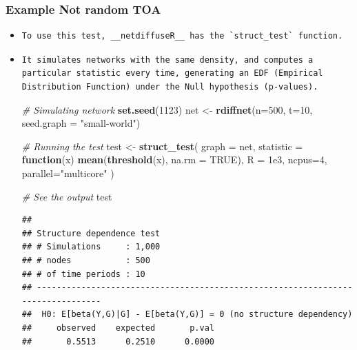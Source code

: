 \documentclass[]{book}
\newenvironment{Shaded}{\begin{snugshade}}{\end{snugshade}}
\newcommand{\CommentTok}[1]{\textcolor[rgb]{0.56,0.35,0.01}{\textit{#1}}}
\newcommand{\ControlFlowTok}[1]{\textcolor[rgb]{0.13,0.29,0.53}{\textbf{#1}}}
\newcommand{\DataTypeTok}[1]{\textcolor[rgb]{0.13,0.29,0.53}{#1}}
\newcommand{\DecValTok}[1]{\textcolor[rgb]{0.00,0.00,0.81}{#1}}
\newcommand{\FloatTok}[1]{\textcolor[rgb]{0.00,0.00,0.81}{#1}}
\newcommand{\KeywordTok}[1]{\textcolor[rgb]{0.13,0.29,0.53}{\textbf{#1}}}
\newcommand{\NormalTok}[1]{#1}
\newcommand{\OtherTok}[1]{\textcolor[rgb]{0.56,0.35,0.01}{#1}}
\newcommand{\StringTok}[1]{\textcolor[rgb]{0.31,0.60,0.02}{#1}}
\begin{document}
\hypertarget{example-not-random-toa}{%
\subsubsection{Example Not random TOA}\label{example-not-random-toa}}

\begin{itemize}
\item
\begin{verbatim}
To use this test, __netdiffuseR__ has the `struct_test` function.
\end{verbatim}
\item
\begin{verbatim}
It simulates networks with the same density, and computes a particular statistic every time, generating an EDF (Empirical Distribution Function) under the Null hypothesis (p-values).
\end{verbatim}

\begin{Shaded}
\begin{Highlighting}[]
\CommentTok{# Simulating network}
\KeywordTok{set.seed}\NormalTok{(}\DecValTok{1123}\NormalTok{)}
\NormalTok{net <-}\StringTok{ }\KeywordTok{rdiffnet}\NormalTok{(}\DataTypeTok{n=}\DecValTok{500}\NormalTok{, }\DataTypeTok{t=}\DecValTok{10}\NormalTok{, }\DataTypeTok{seed.graph =} \StringTok{"small-world"}\NormalTok{)}

\CommentTok{# Running the test}
\NormalTok{test <-}\StringTok{ }\KeywordTok{struct_test}\NormalTok{(}
  \DataTypeTok{graph     =}\NormalTok{ net, }
  \DataTypeTok{statistic =} \ControlFlowTok{function}\NormalTok{(x) }\KeywordTok{mean}\NormalTok{(}\KeywordTok{threshold}\NormalTok{(x), }\DataTypeTok{na.rm =} \OtherTok{TRUE}\NormalTok{),}
  \DataTypeTok{R         =} \FloatTok{1e3}\NormalTok{,}
  \DataTypeTok{ncpus=}\DecValTok{4}\NormalTok{, }\DataTypeTok{parallel=}\StringTok{"multicore"}
\NormalTok{  )}

\CommentTok{# See the output}
\NormalTok{test}
\end{Highlighting}
\end{Shaded}

\begin{verbatim}
## 
## Structure dependence test
## # Simulations     : 1,000
## # nodes           : 500
## # of time periods : 10
## --------------------------------------------------------------------------------
##  H0: E[beta(Y,G)|G] - E[beta(Y,G)] = 0 (no structure dependency)
##     observed    expected       p.val
##       0.5513      0.2510      0.0000
\end{verbatim}
\end{itemize}
\end{document}
